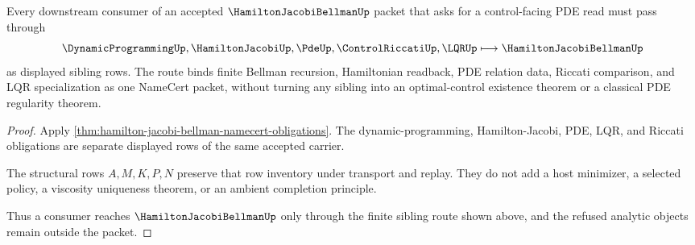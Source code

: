 \begin{theorem}
\label{thm:hamilton-jacobi-bellman-sibling-dependency-route}
Every downstream consumer of an accepted $\HamiltonJacobiBellmanUp$ packet that asks for a control-facing PDE read must pass through
$$
\DynamicProgrammingUp,\HamiltonJacobiUp,\PdeUp,\ControlRiccatiUp,\LQRUp \longmapsto \HamiltonJacobiBellmanUp
$$
as displayed sibling rows. The route binds finite Bellman recursion, Hamiltonian readback, PDE relation data, Riccati comparison, and LQR specialization as one NameCert packet, without turning any sibling into an optimal-control existence theorem or a classical PDE regularity theorem.
\end{theorem}
\begin{proof}
Apply \autoref{thm:hamilton-jacobi-bellman-namecert-obligations}. The dynamic-programming, Hamilton-Jacobi, PDE, LQR, and Riccati obligations are separate displayed rows of the same accepted carrier.

The structural rows $A,M,K,P,N$ preserve that row inventory under transport and replay. They do not add a host minimizer, a selected policy, a viscosity uniqueness theorem, or an ambient completion principle.

Thus a consumer reaches $\HamiltonJacobiBellmanUp$ only through the finite sibling route shown above, and the refused analytic objects remain outside the packet.
\end{proof}





